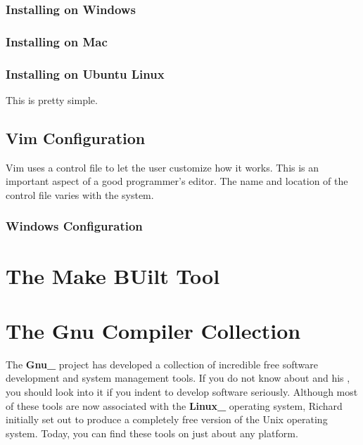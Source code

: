 \documentclass[letterpaper,11pt,english]{sphinxmanual}
\begin{document}
\subsection{Installing on Windows}
\label{\detokenize{appendix/vim-introduction:installing-on-windows}}

\subsection{Installing on Mac}
\label{\detokenize{appendix/vim-introduction:installing-on-mac}}

\subsection{Installing on Ubuntu Linux}
\label{\detokenize{appendix/vim-introduction:installing-on-ubuntu-linux}}
This is pretty simple.


\section{Vim Configuration}
\label{\detokenize{appendix/vim-introduction:vim-configuration}}
Vim uses a control file to let the user customize how it works. This is an
important aspect of a good programmer’s editor. The name and location of the
control file varies with the system.


\subsection{Windows Configuration}
\label{\detokenize{appendix/vim-introduction:windows-configuration}}

\chapter{The Make BUilt Tool}
\label{\detokenize{appendix/make-introduction::doc}}\label{\detokenize{appendix/make-introduction:the-make-built-tool}}

\chapter{The Gnu Compiler Collection}
\label{\detokenize{appendix/the-gnu-compiler-collection::doc}}\label{\detokenize{appendix/the-gnu-compiler-collection:the-gnu-compiler-collection}}
The {\color{red}\bfseries{}Gnu\_} project has developed a collection of incredible free software
development and system management tools. If you do not know about  and his , you should look into it if you
indent to develop software seriously. Although most of these tools are now
associated with the {\color{red}\bfseries{}Linux\_} operating system, Richard initially set out to
produce a completely free version of the Unix operating system. Today, you can
find these tools on just about any platform.
\end{document}
